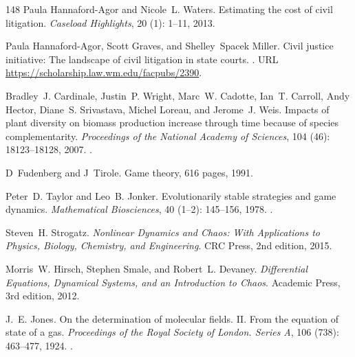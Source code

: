 \documentclass[11pt]{article}
\theoremstyle{plain}
\theoremstyle{definition}
\theoremstyle{remark}
\begin{document}
\begin{thebibliography}{148}
Paula Hannaford-Agor and Nicole~L. Waters.
\newblock Estimating the cost of civil litigation.
\newblock \emph{Caseload Highlights}, 20 (1): 1--11, 2013.

Paula Hannaford-Agor, Scott Graves, and Shelley~Spacek Miller.
\newblock Civil justice initiative: The landscape of civil litigation in state
  courts.
.
\newblock URL \url{https://scholarship.law.wm.edu/facpubs/2390}.

Bradley~J. Cardinale, Justin~P. Wright, Marc~W. Cadotte, Ian~T. Carroll, Andy
  Hector, Diane~S. Srivastava, Michel Loreau, and Jerome~J. Weis.
\newblock Impacts of plant diversity on biomass production increase through
  time because of species complementarity.
\newblock \emph{Proceedings of the National Academy of Sciences}, 104
  (46): 18123--18128, 2007.
\newblock {}.

D~Fudenberg and J~Tirole.
\newblock Game theory, 616 pages, 1991.

Peter~D. Taylor and Leo~B. Jonker.
\newblock Evolutionarily stable strategies and game dynamics.
\newblock \emph{Mathematical Biosciences}, 40 (1--2):
  145--156, 1978.
\newblock {}.

Steven~H. Strogatz.
\newblock \emph{Nonlinear Dynamics and Chaos: With Applications to Physics,
  Biology, Chemistry, and Engineering}.
\newblock CRC Press, 2nd edition, 2015.

Morris~W. Hirsch, Stephen Smale, and Robert~L. Devaney.
\newblock \emph{Differential Equations, Dynamical Systems, and an Introduction
  to Chaos}.
\newblock Academic Press, 3rd edition, 2012.

J.~E. Jones.
\newblock On the determination of molecular fields. {II}. {From} the equation
  of state of a gas.
\newblock \emph{Proceedings of the Royal Society of London. Series A},
  106 (738): 463--477, 1924.
\newblock {}.


\end{thebibliography}
\end{document}
